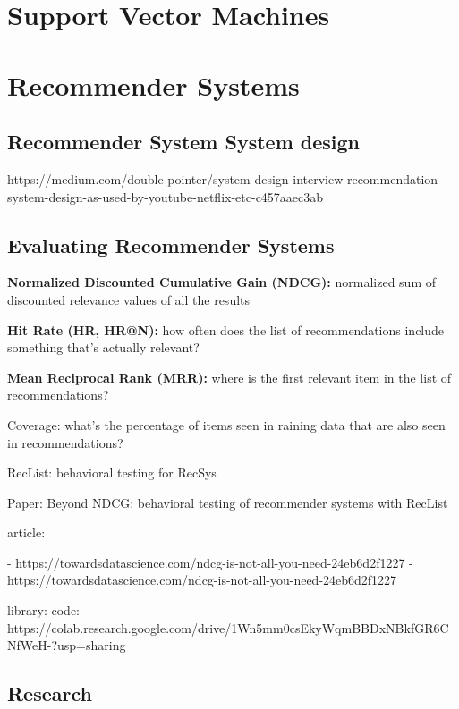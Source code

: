 \documentclass[openany]{book}
\begin{document}
\chapter{Support Vector Machines}



\chapter{Recommender Systems}


\section{Recommender System System design}

https://medium.com/double-pointer/system-design-interview-recommendation-system-design-as-used-by-youtube-netflix-etc-c457aaec3ab


\section{Evaluating Recommender Systems}


\textbf{Normalized Discounted Cumulative Gain (NDCG):} normalized sum of discounted relevance values of all the results

\textbf{Hit Rate (HR, HR@N):} how often does the list of recommendations include something that's actually relevant?

\textbf{Mean Reciprocal Rank (MRR):} where is the first relevant item in the list of recommendations?

Coverage: what's the percentage of items seen in raining data that are also seen in recommendations?

RecList: behavioral testing for RecSys

Paper: Beyond NDCG: behavioral testing of recommender systems with RecList

article: 

- https://towardsdatascience.com/ndcg-is-not-all-you-need-24eb6d2f1227
- https://towardsdatascience.com/ndcg-is-not-all-you-need-24eb6d2f1227


library: 
code: https://colab.research.google.com/drive/1Wn5mm0csEkyWqmBBDxNBkfGR6CNfWeH-?usp=sharing



\section{Research}
\end{document}
